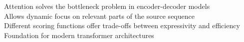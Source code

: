 \documentclass[preview]{standalone}
\begin{document}
Attention solves the bottleneck problem in encoder-decoder models\\Allows dynamic focus on relevant parts of the source sequence\\Different scoring functions offer trade-offs between expressivity and efficiency\\Foundation for modern transformer architectures\\
\end{document}
